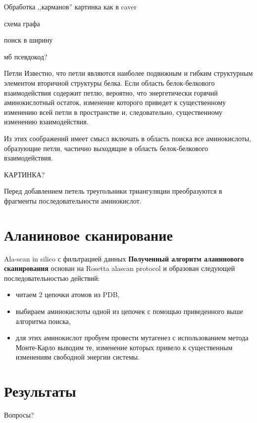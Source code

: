 \documentclass[12pt, xcolor={dvipsnames}]{beamer}
\begin{document}
\begin{frame}{Обработка ,,карманов''}
картинка как в caver

схема графа

поиск в ширину

мб псевдокод?

\end{frame}
\begin{frame}{Петли}
Известно, что петли являются наиболее подвижным и гибким структурным элементом вторичной структуры белка. Если область белок-белкового взаимодействия содержит петлю, вероятно, что энергетически горячий аминокислотный остаток, изменение которого приведет к существенному изменению всей петли в пространстве и, следовательно, существенному изменению взаимодействия.

Из этих соображений имеет смысл включать в область поиска все аминокислоты, образующие петли, частично выходящие в область белок-белкового взаимодействия.

КАРТИНКА?

Перед добавлением петель треугольники триангуляции преобразуются в фрагменты последовательности аминокислот.

\end{frame}
\section{Аланиновое сканирование}

\begin{frame}{Ala-scan in silico с фильтрацией данных}
\textbf{Полученный алгоритм аланинового сканирования} основан на Rosetta alascan protocol и образован следующей последовательностью действий:
\begin{itemize}
\item читаем 2 цепочки атомов из PDB,
\item выбираем аминокислоты одной из цепочек с помощью приведенного выше алгоритма поиска,
\item для этих аминокислот пробуем провести мутагенез с использованием метода Монте-Карло выводим те, изменение которых привело к существенным изменениям свободной энергии системы.
\end{itemize}
\end{frame}

\section{Результаты}

\begin{frame}{}
Вопросы?
\end{frame}
\end{document}
